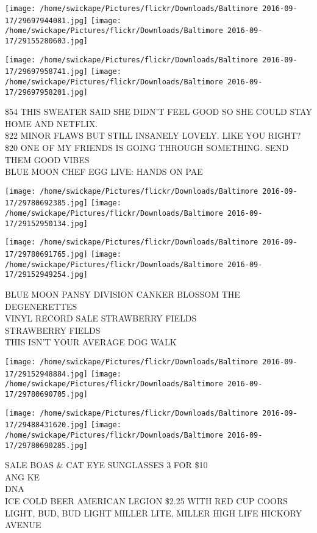 \documentclass[10pt,letterpaper]{article}
\begin{document}
\texttt{[image: /home/swickape/Pictures/flickr/Downloads/Baltimore 2016-09-17/29697944081.jpg]}
\texttt{[image: /home/swickape/Pictures/flickr/Downloads/Baltimore 2016-09-17/29155280603.jpg]}

\texttt{[image: /home/swickape/Pictures/flickr/Downloads/Baltimore 2016-09-17/29697958741.jpg]}
\texttt{[image: /home/swickape/Pictures/flickr/Downloads/Baltimore 2016-09-17/29697958201.jpg]}

\$54 THIS SWEATER SAID SHE DIDN'T FEEL GOOD SO SHE COULD STAY HOME AND NETFLIX.\\
\$22 MINOR FLAWS BUT STILL INSANELY LOVELY.  LIKE YOU RIGHT?\\
\$20 ONE OF MY FRIENDS IS GOING THROUGH SOMETHING.  SEND THEM GOOD VIBES\\
BLUE MOON CHEF EGG LIVE: HANDS ON PAE\\
\pagebreak

\texttt{[image: /home/swickape/Pictures/flickr/Downloads/Baltimore 2016-09-17/29780692385.jpg]}
\texttt{[image: /home/swickape/Pictures/flickr/Downloads/Baltimore 2016-09-17/29152950134.jpg]}

\texttt{[image: /home/swickape/Pictures/flickr/Downloads/Baltimore 2016-09-17/29780691765.jpg]}
\texttt{[image: /home/swickape/Pictures/flickr/Downloads/Baltimore 2016-09-17/29152949254.jpg]}

BLUE MOON PANSY DIVISION CANKER BLOSSOM THE DEGENERETTES\\
VINYL RECORD SALE STRAWBERRY FIELDS\\
STRAWBERRY FIELDS\\
THIS ISN'T YOUR AVERAGE DOG WALK\\
\pagebreak

\texttt{[image: /home/swickape/Pictures/flickr/Downloads/Baltimore 2016-09-17/29152948884.jpg]}
\texttt{[image: /home/swickape/Pictures/flickr/Downloads/Baltimore 2016-09-17/29780690705.jpg]}

\texttt{[image: /home/swickape/Pictures/flickr/Downloads/Baltimore 2016-09-17/29488431620.jpg]}
\texttt{[image: /home/swickape/Pictures/flickr/Downloads/Baltimore 2016-09-17/29780690285.jpg]}

SALE BOAS \& CAT EYE SUNGLASSES 3 FOR \$10\\
ANG KE\\
DNA\\
ICE COLD BEER AMERICAN LEGION \$2.25 WITH RED CUP COORS LIGHT, BUD, BUD LIGHT MILLER LITE, MILLER HIGH LIFE HICKORY AVENUE\\
\pagebreak
\end{document}
